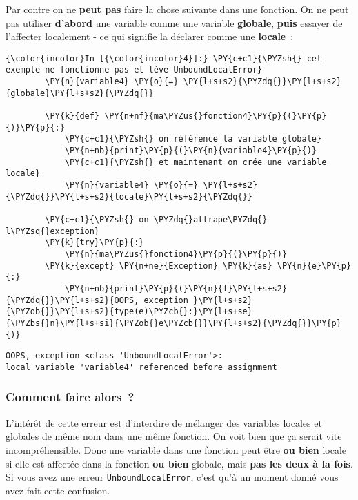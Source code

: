     Par contre on ne \textbf{peut pas} faire la chose suivante dans une
fonction. On ne peut pas utiliser \textbf{d'abord} une variable comme
une variable \textbf{globale}, \textbf{puis} essayer de l'affecter
localement - ce qui signifie la déclarer comme une \textbf{locale}~:

    \begin{Verbatim}[commandchars=\\\{\},frame=single,framerule=0.3mm,rulecolor=\color{cellframecolor}]
{\color{incolor}In [{\color{incolor}4}]:} \PY{c+c1}{\PYZsh{} cet exemple ne fonctionne pas et lève UnboundLocalError}
        \PY{n}{variable4} \PY{o}{=} \PY{l+s+s2}{\PYZdq{}}\PY{l+s+s2}{globale}\PY{l+s+s2}{\PYZdq{}}
        
        \PY{k}{def} \PY{n+nf}{ma\PYZus{}fonction4}\PY{p}{(}\PY{p}{)}\PY{p}{:}
            \PY{c+c1}{\PYZsh{} on référence la variable globale}
            \PY{n+nb}{print}\PY{p}{(}\PY{n}{variable4}\PY{p}{)}
            \PY{c+c1}{\PYZsh{} et maintenant on crée une variable locale}
            \PY{n}{variable4} \PY{o}{=} \PY{l+s+s2}{\PYZdq{}}\PY{l+s+s2}{locale}\PY{l+s+s2}{\PYZdq{}}
        
        \PY{c+c1}{\PYZsh{} on \PYZdq{}attrape\PYZdq{} l\PYZsq{}exception}
        \PY{k}{try}\PY{p}{:}
            \PY{n}{ma\PYZus{}fonction4}\PY{p}{(}\PY{p}{)}
        \PY{k}{except} \PY{n+ne}{Exception} \PY{k}{as} \PY{n}{e}\PY{p}{:}
            \PY{n+nb}{print}\PY{p}{(}\PY{n}{f}\PY{l+s+s2}{\PYZdq{}}\PY{l+s+s2}{OOPS, exception }\PY{l+s+s2}{\PYZob{}}\PY{l+s+s2}{type(e)\PYZcb{}:}\PY{l+s+se}{\PYZbs{}n}\PY{l+s+si}{\PYZob{}e\PYZcb{}}\PY{l+s+s2}{\PYZdq{}}\PY{p}{)}
\end{Verbatim}


    \begin{Verbatim}[commandchars=\\\{\},frame=single,framerule=0.3mm,rulecolor=\color{cellframecolor}]
OOPS, exception <class 'UnboundLocalError'>:
local variable 'variable4' referenced before assignment
\end{Verbatim}

    \hypertarget{comment-faire-alors}{%
\subsubsection{Comment faire alors~?}\label{comment-faire-alors}}

    L'intérêt de cette erreur est d'interdire de mélanger des variables
locales et globales de même nom dans une même fonction. On voit bien que
ça serait vite incompréhensible. Donc une variable dans une fonction
peut être \textbf{ou bien} locale si elle est affectée dans la fonction
\textbf{ou bien} globale, mais \textbf{pas les deux à la fois}. Si vous
avez une erreur \texttt{UnboundLocalError}, c'est qu'à un moment donné
vous avez fait cette confusion.

